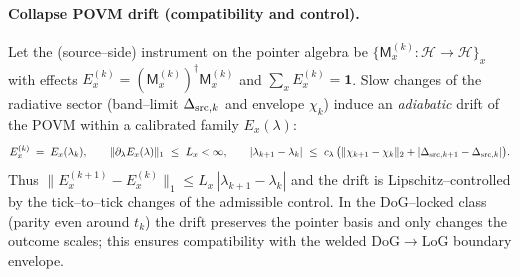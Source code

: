 \documentclass[10pt]{article}
\theoremstyle{definition}
\theoremstyle{plain}
\begin{document}
\paragraph{Collapse POVM drift (compatibility and control).}\label{par:uom-main-034}
Let the (source–side) instrument on the pointer algebra be
$\{\mathsf M^{(k)}_x:\mathcal H\to\mathcal H\}_x$ with effects
$E^{(k)}_x=(\mathsf M^{(k)}_x)^\dagger\mathsf M^{(k)}_x$ and $\sum_x E^{(k)}_x=\mathbf 1$.
Slow changes of the radiative sector (band–limit $\Delta_{{\rm src},k}$ and envelope $\chi_k$)
induce an \emph{adiabatic} drift of the POVM within a calibrated family $E_x(\lambda)$:
\[
E^{(k)}_x\;=\;E_x(\lambda_k),\qquad
\|\partial_\lambda E_x(\lambda)\|_1\ \le\ L_x<\infty,\qquad
|\lambda_{k+1}-\lambda_k|\ \le\ c_\lambda\,\big(\|\chi_{k+1}-\chi_k\|_2+|\Delta_{{\rm src},k+1}-\Delta_{{\rm src},k}|\big).
\]
Thus $\|E^{(k+1)}_x-E^{(k)}_x\|_1\le L_x\,|\lambda_{k+1}-\lambda_k|$ and the drift is Lipschitz–controlled by the tick–to–tick changes of the admissible control. In the DoG–locked class (parity even around $t_k$) the drift preserves the pointer basis and only changes the outcome scales; this ensures compatibility with the welded DoG$\to$LoG boundary envelope.
\end{document}
